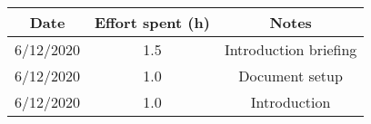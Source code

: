 \documentclass[../../main.tex]{subfiles}
\begin{document}
\begin{center}
    \begin{tabular}{|c| |c| |c|} 
        \hline
        Date & Effort spent (h) & Notes\\ [0.5ex] 
        \hline\hline
        6/12/2020 & 1.5 & Introduction briefing\\ 
        6/12/2020 & 1.0 & Document setup\\
        6/12/2020 & 1.0 & Introduction\\
        \hline
    \end{tabular}
\end{center}
\end{document}

